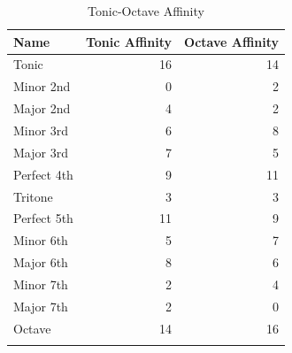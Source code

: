 \documentclass[sn-mathphys]{sn-jnl}%
\begin{document}
\begin{table}[h]
\begin{center}
\begin{minipage}{174pt}
\caption{Tonic-Octave Affinity}\label{tab1}%
\begin{tabular}{@{}lrr@{}}
\toprule
Name & Tonic Affinity & Octave Affinity\\
\midrule
Tonic & 16 & 14 \\
Minor 2nd & 0 & 2 \\
Major 2nd & 4 & 2 \\
Minor 3rd & 6 & 8 \\
Major 3rd & 7 & 5 \\
Perfect 4th & 9 & 11 \\
Tritone & 3 & 3 \\
Perfect 5th & 11 & 9 \\
Minor 6th & 5 & 7 \\
Major 6th & 8 & 6 \\
Minor 7th & 2 & 4 \\
Major 7th & 2 & 0 \\
Octave & 14 & 16 \\
\botrule
\end{tabular}
\end{minipage}
\end{center}
\end{table}
\end{document}
